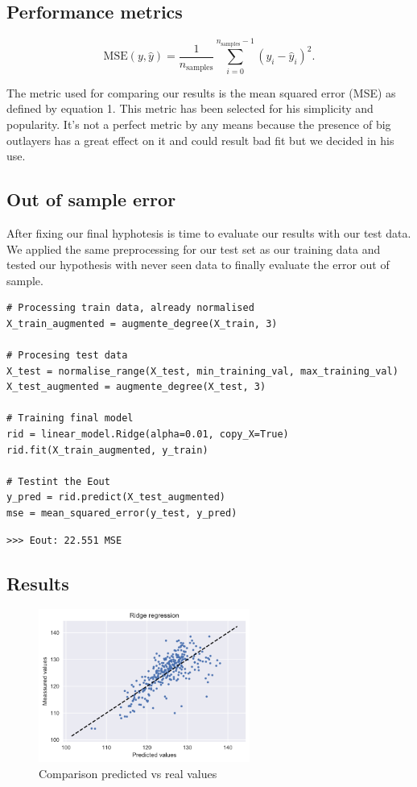 \documentclass{article}
\begin{document}
\subsection{Performance metrics}
\begin{equation}
    \text{MSE}(y, \hat{y}) = \frac{1}{n_\text{samples}} \sum_{i=0}^{n_\text{samples} - 1} (y_i - \hat{y}_i)^2.
\end{equation}

The metric used for comparing our results is the mean squared error (MSE) as defined by equation 1. This metric has been selected for his simplicity and popularity. It's not a perfect metric by any means because the presence of big outlayers has a great effect on it and could result bad fit but we decided in his use.



\subsection{Out of sample error}
After fixing our final hyphotesis is time to evaluate our results with our test data. We applied the same preprocessing for our test set as our training data and tested our hypothesis with never seen data to finally evaluate the error out of sample.

\begin{verbatim}
# Processing train data, already normalised
X_train_augmented = augmente_degree(X_train, 3)

# Procesing test data
X_test = normalise_range(X_test, min_training_val, max_training_val)
X_test_augmented = augmente_degree(X_test, 3)

# Training final model
rid = linear_model.Ridge(alpha=0.01, copy_X=True)
rid.fit(X_train_augmented, y_train)

# Testint the Eout
y_pred = rid.predict(X_test_augmented)
mse = mean_squared_error(y_test, y_pred)
\end{verbatim}

\begin{verbatim}
>>> Eout: 22.551 MSE
\end{verbatim}

\subsection{Results}
\begin{figure}[H]
    \centering
    \includegraphics[height=190px]{figures/r3}
    \caption{Comparison predicted vs real values}
    \label{fig:my_label}
\end{figure}
\end{document}

